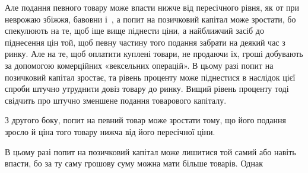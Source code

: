 Але подання певного товару може впасти нижче від пересічного рівня, як
от при неврожаю збіжжя, бавовни і~, а попит на позичковий капітал може
зростати, бо спекулюють на те, щоб іще вище піднести ціни, а найближчий
засіб до піднесення цін той, щоб певну частину того подання забрати на деякий
час з ринку. Але на те, щоб оплатити куплені товари, не продаючи їх,
гроші добувають за допомогою комерційних «вексельних операцій». В цьому
разі попит на позичковий капітал зростає, та рівень проценту може піднестися
в наслідок цієї спроби штучно утруднити довіз товару до ринку. Вищий рівень
проценту тоді свідчить про штучно зменшене подання товарового капіталу.

З другого боку, попит на певний товар може зростати тому, що його подання
зросло й ціна того товару нижча від його пересічної ціни.

В цьому разі попит на позичковий капітал може лишитися той самий або
навіть впасти, бо за ту саму грошову суму можна мати більше товарів. Однак
\parbreak{}  %
